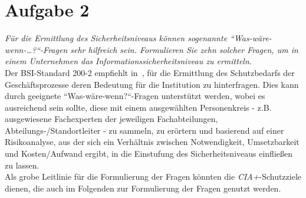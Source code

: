 \chapter{Aufgabe 2}

\textit{Für die Ermittlung des Sicherheitsniveaus können sogenannte ``Was-wäre-wenn-\ldots?``-Fragen sehr hilfreich sein. Formulieren Sie zehn solcher Fragen, um in einem Unternehmen das Informationssicherheitsniveau zu ermitteln.}\\

\noindent
Der BSI-Standard 200-2 empfiehlt in~\cite[110]{BSI200-2}, für die Ermittlung des Schutzbedarfs der Geschäftsprozesse deren Bedeutung für die Institution zu hinterfragen.
Dies kann durch geeignete ``Was-wäre-wenn{?}``-Fragen unterstützt werden, wobei es ausreichend sein sollte, diese mit einem ausgewählten Personenkreis - z.B. ausgewiesene Fachexperten der jeweiligen Fachabteilungen, Abteilungs-/Standortleiter - zu sammeln, zu erörtern und basierend auf einer Risikoanalyse, aus der sich ein Verhältnis zwischen Notwendigkeit, Umsetzbarkeit und Kosten/Aufwand ergibt, in die Einstufung des Sicherheitsniveaus einfließen zu lassen.\\

\noindent
Als grobe Leitlinie für die Formulierung der Fragen könnten die \textit{CIA+}-Schutzziele dienen, die auch im Folgenden zur Formulierung der Fragen genutzt werden.

